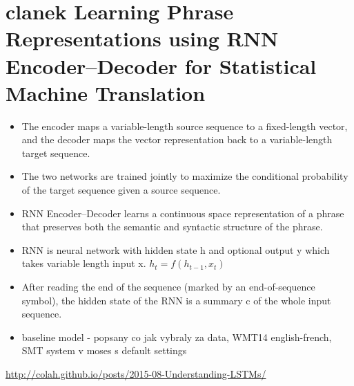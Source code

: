 \section{clanek Learning Phrase Representations using RNN Encoder–Decoder for Statistical Machine Translation}
\begin{itemize}
  \item The encoder maps a variable-length source sequence to a fixed-length vector, and the decoder maps the vector representation back to a variable-length target sequence.
  \item The two networks are trained jointly to maximize the conditional probability of the target sequence given a source sequence.
  \item RNN Encoder–Decoder learns a continuous space representation of a phrase that preserves both the semantic and syntactic structure of the phrase.
  \item RNN is neural network with hidden state h and optional output y which takes variable length input x. $h_t = f(h_{t-1}, x_t)$
  \item After reading the end of the sequence (marked by an end-of-sequence symbol), the hidden state of the RNN is a summary c of the whole input sequence.
  \item baseline model - popsany co jak vybraly za data, WMT14 english-french, SMT system v moses s default settings
\end{itemize}

\url{http://colah.github.io/posts/2015-08-Understanding-LSTMs/}
